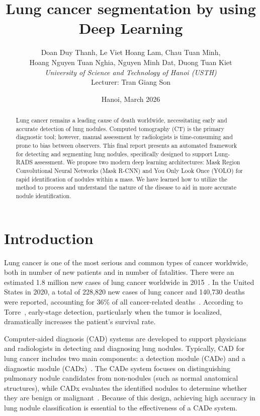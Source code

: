 \documentclass[conference]{IEEEtran}
\title{Lung cancer segmentation by using Deep Learning}
\author{
Doan Duy Thanh, Le Viet Hoang Lam, Chau Tuan Minh,\\
Hoang Nguyen Tuan Nghia, Nguyen Minh Dat, Duong Tuan Kiet\\
\textit{University of Science and Technology of Hanoi (USTH)}\\
Lecturer: Tran Giang Son
}
\date{Hanoi, March 2026}
\begin{document}
\pagestyle{plain}

\maketitle
\begin{abstract}
Lung cancer remains a leading cause of death worldwide, necessitating early and accurate detection of lung nodules. Computed tomography (CT) is the primary diagnostic tool; however, manual assessment by radiologists is time-consuming and prone to bias between observers. This final report presents an automated framework for detecting and segmenting lung nodules, specifically designed to support Lung-RADS assessment. We propose two modern deep learning architectures: Mask Region Convolutional Neural Networks (Mask R-CNN) and You Only Look Once (YOLO) for rapid identification of nodules within a mass. We have learned how to utilize the method to process and understand the nature of the disease to aid in more accurate nodule identification.
\end{abstract}

\section{Introduction}
Lung cancer is one of the most serious and common types of
cancer worldwide, both in number of new patients
and in number of fatalities. There were an estimated
1.8 million new cases of lung cancer worldwide in 2015~\cite{Siegel2017}.
In the United States in 2020, a total of 228{,}820 new cases of lung cancer
and 140{,}730 deaths were reported, accounting for 36\% of all cancer-related deaths~\cite{Siegel2020}. According to Torre~\cite{Torre2016}, early-stage detection, particularly when the tumor is localized, dramatically increases the patient's survival rate.


Computer-aided diagnosis (CAD) systems are developed to support physicians and radiologists in detecting and diagnosing lung nodules. Typically, CAD for lung cancer includes two main components: a detection module (CADe) and a diagnostic module (CADx)~\cite{LungRADS}. The CADe system focuses on distinguishing pulmonary nodule candidates from non-nodules (such as normal anatomical structures), while CADx evaluates the identified nodules to determine whether they are benign or malignant~\cite{Doi2007}. Because of this design, achieving high accuracy in lung nodule classification is essential to the effectiveness of a CADe system.
\end{document}
